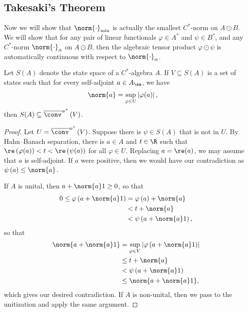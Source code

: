 \documentclass[10pt]{mypackage}
\begin{document}
\subsection{Takesaki's Theorem}%
Now we will show that $\norm{\cdot}_{\min}$ is actually the smallest $C^{\ast}$-norm on $A\odot B$. We will show that for any pair of linear functionals $\varphi\in A^{\ast}$ and $\psi\in B^{\ast}$, and any $C^{\ast}$-norm $\norm{\cdot}_{\alpha}$ on $A\odot B$, then the algebraic tensor product $\varphi\odot\psi$ is automatically continuous with respect to $\norm{\cdot}_{\alpha}$.
\begin{lemma}
  Let $S\left( A \right)$ denote the state space of a $C^{\ast}$-algebra $A$. If $ V\subseteq S(A) $ is a set of states such that for every self-adjoint $a\in A_{\sa}$, we have
  \begin{align*}
    \norm{a} &= \sup_{\varphi\in U} \left\vert \varphi(a) \right\vert,
  \end{align*}
  then $ S(A)\subseteq \overline{\conv}^{w^{\ast}}\left( V \right) $.
\end{lemma}
\begin{proof}
  Let $ U = \overline{\conv}^{w^{\ast}}\left( V \right) $. Suppose there is $\psi\in S(A)$ that is not in $U$. By Hahn--Banach separation, there is $a\in A$ and $t\in \R$ such that $\re\left( \varphi(a) \right) < t < \re\left( \psi(a) \right)$ for all $\varphi\in U$. Replacing $a = \re(a)$, we may assume that $a$ is self-adjoint. If $a$ were positive, then we would have our contradiction as $\psi\left( a \right) \leq \norm{a}$.

  If $A$ is unital, then $a + \norm{a}1 \geq 0$, so that
  \begin{align*}
    0\leq \varphi\left( a + \norm{a}1 \right) &= \varphi\left( a \right) + \norm{a}\\
                                                &< t + \norm{a}\\
                                                &< \psi\left( a + \norm{a}1 \right),
  \end{align*}
  so that
  \begin{align*}
    \norm{a + \norm{a}1} &= \sup_{\varphi\in V} \left\vert \varphi\left( a + \norm{a}1 \right) \right\vert\\
                         &\leq t + \norm{a}\\
                         &< \psi\left( a + \norm{a}1 \right)\\
                         &\leq \norm{a + \norm{a}1},
  \end{align*}
  which gives our desired contradiction. If $A$ is non-unital, then we pass to the unitization and apply the same argument.
\end{proof}
\end{document}
